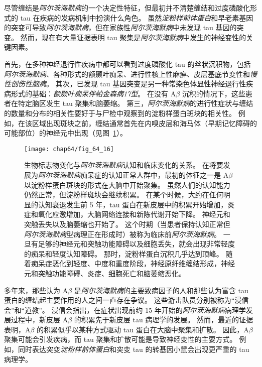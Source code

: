 尽管缠结是\textit{阿尔茨海默病}的一个决定性特征，但最初并不清楚缠结和过度磷酸化形式的 tau 在疾病的发病机制中扮演什么角色。
虽然\textit{淀粉样前体蛋白}和早老素基因的突变可导致\textit{阿尔茨海默病}，但在家族性\textit{阿尔茨海默病}中未发现 tau 基因的突变。
然而，现在有大量证据表明 tau 聚集是\textit{阿尔茨海默病}中发生的神经变性的关键因素。


首先，在多种神经退行性疾病中都可以看到过度磷酸化 tau 的丝状沉积物，包括\textit{阿尔茨海默病}、各种形式的额颞叶痴呆、进行性核上性麻痹、皮层基底节变性和\textit{慢性创伤性脑病}。
其次，已发现 tau 基因突变是另一种常染色体显性神经退行性疾病形式的基础：\textit{额颞叶痴呆伴帕金森病17型}。
在没有 A$\beta$ 沉积的情况下，这些患者在特定脑区发生 tau 聚集和脑萎缩。
第三，\textit{阿尔茨海默病}的进行性症状与缠结的数量和分布的相关性要好于与尸检中观察到的淀粉样蛋白斑块的相关性。
例如，在该区域出现斑块之前，缠结通常首先在内嗅皮层和海马体（早期记忆障碍的可能部位）的神经元中出现（见图~\ref{fig:64_16}）。


\begin{figure}[htbp]
	\centering
	\texttt{[image: chap64/fig\_64\_16]}
	\caption{生物标志物变化与\textit{阿尔茨海默病}认知和临床变化的关系。
		在将要发展为\textit{阿尔茨海默病}痴呆症的认知正常人群中，最初的体征之一是 A$\beta$ 以淀粉样蛋白斑块的形式在大脑中开始聚集。
		虽然人们的认知能力仍然正常，但淀粉样斑块会继续积累。
		在某个时候，大约在任何明显的认知衰退发生前 5 年，tau 蛋白在新皮层中的积累开始增加，炎症和氧化应激增加，大脑网络连接和新陈代谢开始下降。
		神经元和突触丢失以及脑萎缩也开始了。
		这个时期（当患者保持认知正常但\textit{阿尔茨海默病}型病理正在形成时）被称为临床前\textit{阿尔茨海默病}。
		一旦有足够的神经元和突触功能障碍以及细胞丢失，就会出现非常轻度的痴呆和轻度认知障碍。
		那时，淀粉样蛋白沉积几乎达到顶峰。
		随着痴呆症恶化到轻度、中度和重度阶段，神经原纤维缠结形成，神经元和突触功能障碍、炎症、细胞死亡和脑萎缩恶化\cite{perrin2009multimodal}。}
	\label{fig:64_16}
\end{figure}


多年来，那些认为 A$\beta$ 是\textit{阿尔茨海默病}的主要致病因子的人和那些认为富含 tau 蛋白的缠结起主要作用的人之间一直存在争议。
这些游击队员分别被称为“浸信会”和“道教”。
浸信会指出，在症状出现前约 15 年开始的\textit{阿尔茨海默病}病理学发展过程中，新皮层 A$\beta$ 的积累先于新皮层 tau 病理学的发展。
然而，最近的证据表明，A$\beta$ 的积累似乎以某种方式驱动 tau 蛋白在大脑中聚集和扩散。
因此，A$\beta$ 聚集可能会引发疾病，而 tau 聚集和扩散可能是导致神经变性的主要方式。
例如，同时表达突变\textit{淀粉样前体蛋白}和突变 tau 的转基因小鼠会出现更严重的 tau 病理学。


